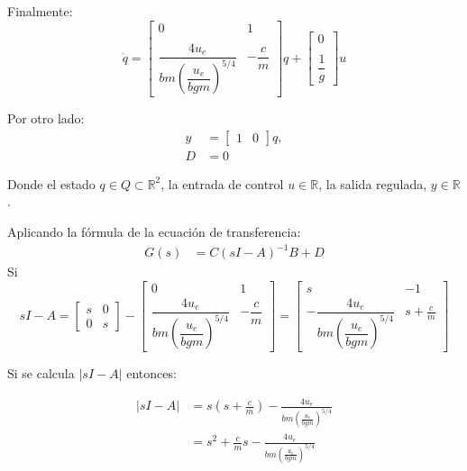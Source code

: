 Finalmente:
\begin{equation*}
    \dot{q}=\left[\begin{array}{cc}
    0 & 1\\\\
\dfrac{4u_{e}}{bm \left( \dfrac{u_{e}}{bgm} \right)^{5/4}} & -\dfrac{c}{m}
\end{array}\right]q + 
\left[\begin{array}{c}0\\\\
\dfrac{1}{g}
\end{array}\right]u
\end{equation*}

Por otro lado:
\begin{align*}
y &= \begin{bmatrix} 1 & 0 \end{bmatrix}q, \\
D &= 0
\end{align*}

Donde el estado $q \in Q \subset \mathbb{R}^2$, la entrada de control $u \in \mathbb{R}$, la salida regulada, $y \in \mathbb{R}$.

Aplicando la fórmula de la ecuación de transferencia:
\begin{align*}
G(s) &= C(sI - A)^{-1}B + D
\end{align*}
Si
\[
sI - A = 
\begin{bmatrix}
s & 0 \\
0 & s
\end{bmatrix}
-
\begin{bmatrix}
0 & 1 \\[2ex]
\dfrac{4u_{e}}{bm \left( \dfrac{u_{e}}{bgm} \right)^{5/4}} & -\dfrac{c}{m}
\end{bmatrix}
=
\begin{bmatrix}
s & -1 \\[2ex]
- \dfrac{4u_{e}}{bm \left( \dfrac{u_{e}}{bgm} \right)^{5/4}}  & s + \frac{c}{m} 
\end{bmatrix}
\]

Si se calcula \( \left| sI - A \right| \) entonces:

\begin{align*}
\left| sI - A \right| &= s \left( s + \frac{c}{m} \right) - \frac{4 u_{e}}{b m \left( \frac{u_{e}}{b g m} \right)^{5/4}} \\
                      &= s^2 + \frac{c}{m} s - \frac{4 u_{e}}{b m \left( \frac{u_{e}}{b g m} \right)^{5/4}}
\end{align*}

